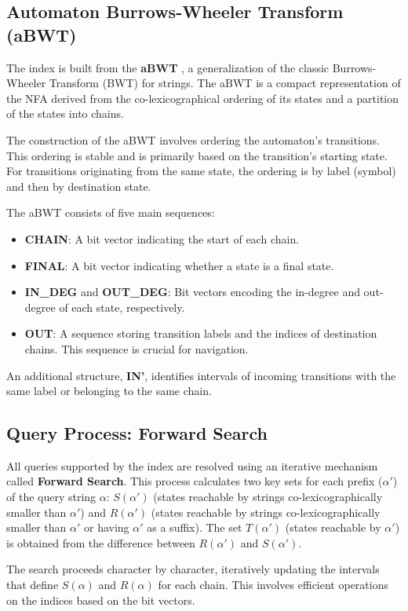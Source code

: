 \subsection{Automaton Burrows-Wheeler Transform (aBWT)}
The index is built from the \textbf{aBWT} \cite{cotumaccio2023co}, a generalization of the classic Burrows-Wheeler Transform (BWT) for strings. The aBWT is a compact representation of the NFA derived from the co-lexicographical ordering of its states and a partition of the states into chains.

The construction of the aBWT involves ordering the automaton's transitions. This ordering is stable and is primarily based on the transition's starting state. For transitions originating from the same state, the ordering is by label (symbol) and then by destination state.

The aBWT consists of five main sequences:
\begin{itemize}
    \item \textbf{CHAIN}: A bit vector indicating the start of each chain.
    \item \textbf{FINAL}: A bit vector indicating whether a state is a final state.
    \item \textbf{IN\_DEG} and \textbf{OUT\_DEG}: Bit vectors encoding the in-degree and out-degree of each state, respectively.
    \item \textbf{OUT}: A sequence storing transition labels and the indices of destination chains. This sequence is crucial for navigation.
\end{itemize}
An additional structure, \textbf{IN'}, identifies intervals of incoming transitions with the same label or belonging to the same chain.

\subsection{Query Process: Forward Search} 
All queries supported by the index are resolved using an iterative mechanism called \textbf{Forward Search}. This process calculates two key sets for each prefix ($\alpha'$) of the query string $\alpha$: $S(\alpha')$ (states reachable by strings co-lexicographically smaller than $\alpha'$) and $R(\alpha')$ (states reachable by strings co-lexicographically smaller than $\alpha'$ or having $\alpha'$ as a suffix). The set $T(\alpha')$ (states reachable by $\alpha'$) is obtained from the difference between $R(\alpha')$ and $S(\alpha')$.

The search proceeds character by character, iteratively updating the intervals that define $S(\alpha)$ and $R(\alpha)$ for each chain. This involves efficient operations on the indices based on the bit vectors.

